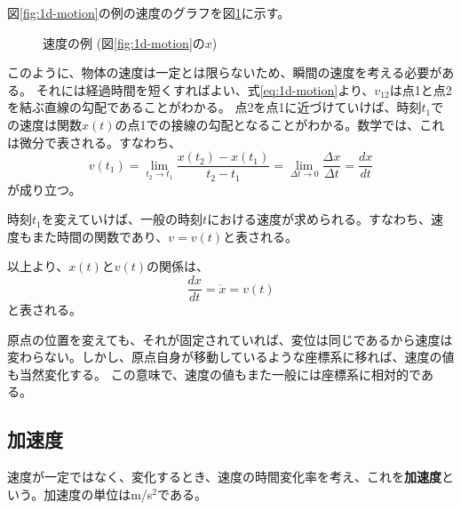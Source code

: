 \documentclass[a4paper, uplatex]{jsarticle}
\numberwithin{equation}{section}
\numberwithin{figure}{section}
\numberwithin{table}{section}
\begin{document}
図\ref{fig:1d-motion}の例の速度のグラフを図\ref{fig:1d-velocity}に示す。

\begin{figure}[htbp]
\centering
{}
\caption{速度の例 (図\ref{fig:1d-motion}の\(x\))}\label{fig:1d-velocity}
\end{figure}

このように、物体の速度は一定とは限らないため、瞬間の速度を考える必要がある。
それには経過時間を短くすればよい、式\ref{eq:1d-motion}より、\(v_{12}\)は点1と点2を結ぶ直線の勾配であることがわかる。
点2を点1に近づけていけば、時刻\(t_1\)での速度は関数\(x(t)\)の点1での接線の勾配となることがわかる。数学では、これは微分で表される。すなわち、
\begin{equation}
  v(t_1) = \lim_{t_2 \to t_1} \frac{x(t_2) - x(t_1)}{t_2 - t_1} = \lim_{\Delta t \to 0} \frac{\Delta x}{\Delta t} = \frac{dx}{dt}
  \label{eq:1d-velocity}
\end{equation}
が成り立つ。

時刻\(t_1\)を変えていけば、一般の時刻\(t\)における速度が求められる。すなわち、速度もまた時間の関数であり、\(v = v(t)\)と表される。

以上より、\(x(t)\)と\(v(t)\)の関係は、
\begin{equation}
  \frac{dx}{dt} = \dot{x} = v(t)
  \label{eq:1d-v-x}
\end{equation}
と表される。

原点の位置を変えても、それが固定されていれば、変位は同じであるから速度は変わらない。しかし、原点自身が移動しているような座標系に移れば、速度の値も当然変化する。
この意味で、速度の値もまた一般には座標系に相対的である。

\subsection{加速度}

速度が一定ではなく、変化するとき、速度の時間変化率を考え、これを\textbf{加速度}という。加速度の単位はm/s\(^2\)である。
\end{document}
